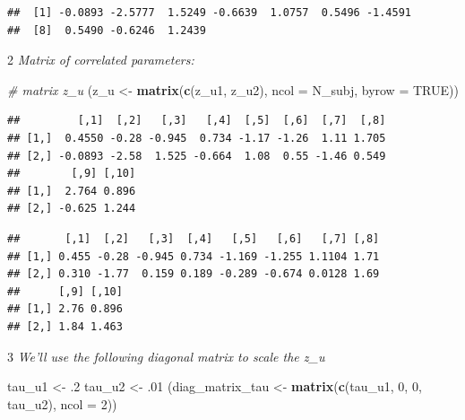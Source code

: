 \documentclass[12pt,]{krantz}
\newenvironment{Shaded}{\begin{snugshade}}{\end{snugshade}}
\newcommand{\KeywordTok}[1]{\textcolor[rgb]{0.13,0.29,0.53}{\textbf{#1}}}
\newcommand{\DataTypeTok}[1]{\textcolor[rgb]{0.13,0.29,0.53}{#1}}
\newcommand{\DecValTok}[1]{\textcolor[rgb]{0.00,0.00,0.81}{#1}}
\newcommand{\FloatTok}[1]{\textcolor[rgb]{0.00,0.00,0.81}{#1}}
\newcommand{\StringTok}[1]{\textcolor[rgb]{0.31,0.60,0.02}{#1}}
\newcommand{\CommentTok}[1]{\textcolor[rgb]{0.56,0.35,0.01}{\textit{#1}}}
\newcommand{\OtherTok}[1]{\textcolor[rgb]{0.56,0.35,0.01}{#1}}
\newcommand{\OperatorTok}[1]{\textcolor[rgb]{0.81,0.36,0.00}{\textbf{#1}}}
\newcommand{\NormalTok}[1]{#1}
\theoremstyle{definition}
\theoremstyle{definition}
\theoremstyle{definition}
\theoremstyle{remark}
\begin{document}
\begin{verbatim}
##  [1] -0.0893 -2.5777  1.5249 -0.6639  1.0757  0.5496 -1.4591
##  [8]  0.5490 -0.6246  1.2439
\end{verbatim}

2 \emph{Matrix of correlated parameters:}

\begin{Shaded}
\begin{Highlighting}[]
\CommentTok{# matrix z_u}
\NormalTok{ (z_u <-}\StringTok{ }\KeywordTok{matrix}\NormalTok{(}\KeywordTok{c}\NormalTok{(z_u1, z_u2), }\DataTypeTok{ncol =}\NormalTok{ N_subj, }\DataTypeTok{byrow =} \OtherTok{TRUE}\NormalTok{))}
\end{Highlighting}
\end{Shaded}

\begin{verbatim}
##         [,1]  [,2]   [,3]   [,4]  [,5]  [,6]  [,7]  [,8]
## [1,]  0.4550 -0.28 -0.945  0.734 -1.17 -1.26  1.11 1.705
## [2,] -0.0893 -2.58  1.525 -0.664  1.08  0.55 -1.46 0.549
##        [,9] [,10]
## [1,]  2.764 0.896
## [2,] -0.625 1.244
\end{verbatim}

\begin{Shaded}
\end{Shaded}

\begin{verbatim}
##       [,1]  [,2]   [,3]  [,4]   [,5]   [,6]   [,7] [,8]
## [1,] 0.455 -0.28 -0.945 0.734 -1.169 -1.255 1.1104 1.71
## [2,] 0.310 -1.77  0.159 0.189 -0.289 -0.674 0.0128 1.69
##      [,9] [,10]
## [1,] 2.76 0.896
## [2,] 1.84 1.463
\end{verbatim}

3 \emph{We'll use the following diagonal matrix to scale the z\_u}

\begin{Shaded}
\begin{Highlighting}[]
\NormalTok{ tau_u1 <-}\StringTok{ }\FloatTok{.2}
\NormalTok{ tau_u2 <-}\StringTok{ }\FloatTok{.01}
\NormalTok{ (diag_matrix_tau <-}\StringTok{ }\KeywordTok{matrix}\NormalTok{(}\KeywordTok{c}\NormalTok{(tau_u1, }\DecValTok{0}\NormalTok{, }\DecValTok{0}\NormalTok{, tau_u2), }\DataTypeTok{ncol =} \DecValTok{2}\NormalTok{))}
\end{Highlighting}
\end{Shaded}
\end{document}
